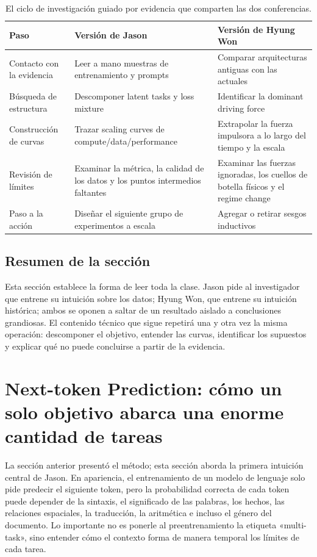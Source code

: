 \documentclass[a4paper]{article}
\begin{document}
\begin{table}[H]
\centering
\begin{tabularx}{\textwidth}{L{0.19\textwidth} >{\raggedright\arraybackslash}X >{\raggedright\arraybackslash}X}
\toprule
Paso & Versión de Jason & Versión de Hyung Won \\
\midrule
Contacto con la evidencia & Leer a mano muestras de entrenamiento y prompts & Comparar arquitecturas antiguas con las actuales \\
Búsqueda de estructura & Descomponer latent tasks y loss mixture & Identificar la dominant driving force \\
Construcción de curvas & Trazar scaling curves de compute/data/performance & Extrapolar la fuerza impulsora a lo largo del tiempo y la escala \\
Revisión de límites & Examinar la métrica, la calidad de los datos y los puntos intermedios faltantes & Examinar las fuerzas ignoradas, los cuellos de botella físicos y el regime change \\
Paso a la acción & Diseñar el siguiente grupo de experimentos a escala & Agregar o retirar sesgos inductivos \\
\bottomrule
\end{tabularx}
\caption{El ciclo de investigación guiado por evidencia que comparten las dos conferencias.}
\end{table}

\subsection{Resumen de la sección}

Esta sección establece la forma de leer toda la clase. Jason pide al investigador que entrene su intuición sobre los datos; Hyung Won, que entrene su intuición histórica; ambos se oponen a saltar de un resultado aislado a conclusiones grandiosas. El contenido técnico que sigue repetirá una y otra vez la misma operación: descomponer el objetivo, entender las curvas, identificar los supuestos y explicar qué no puede concluirse a partir de la evidencia.
\section{Next-token Prediction: cómo un solo objetivo abarca una enorme cantidad de tareas}

La sección anterior presentó el método; esta sección aborda la primera intuición central de Jason. En apariencia, el entrenamiento de un modelo de lenguaje solo pide predecir el siguiente token, pero la probabilidad correcta de cada token puede depender de la sintaxis, el significado de las palabras, los hechos, las relaciones espaciales, la traducción, la aritmética e incluso el género del documento. Lo importante no es ponerle al preentrenamiento la etiqueta «multi-task», sino entender cómo el contexto forma de manera temporal los límites de cada tarea.
\end{document}
